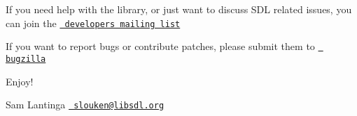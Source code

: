 If you need help with the library, or just want to discuss S\+DL related issues, you can join the \href{http://www.libsdl.org/mailing-list.php}{\texttt{ developers mailing list}}

If you want to report bugs or contribute patches, please submit them to \href{https://bugzilla.libsdl.org/}{\texttt{ bugzilla}}

Enjoy!

Sam Lantinga \href{mailto:slouken@libsdl.org}{\texttt{ slouken@libsdl.\+org}} 